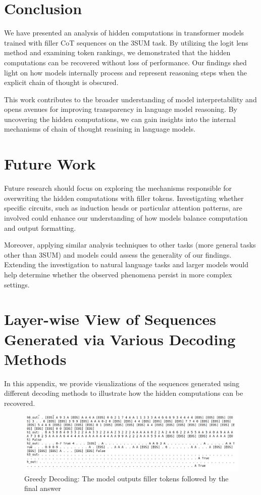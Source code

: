\documentclass{article}
\begin{document}
\newpage
\section{Conclusion}

We have presented an analysis of hidden computations in transformer models trained with filler CoT sequences on the 3SUM task. By utilizing the logit lens method and examining token rankings, we demonstrated that the hidden computations can be recovered without loss of performance. Our findings shed light on how models internally process and represent reasoning steps when the explicit chain of thought is obscured.

This work contributes to the broader understanding of model interpretability and opens avenues for improving transparency in language model reasoning. By uncovering the hidden computations, we can gain insights into the internal mechanisms of chain of thought reasining in language models.

\section{Future Work}

Future research should focus on exploring the mechanisms responsible for overwriting the hidden computations with filler tokens. Investigating whether specific circuits, such as induction heads or particular attention patterns, are involved could enhance our understanding of how models balance computation and output formatting.

Moreover, applying similar analysis techniques to other tasks (more general tasks other than 3SUM) and models could assess the generality of our findings. Extending the investigation to natural language tasks and larger models would help determine whether the observed phenomena persist in more complex settings.

\newpage
\appendix

\section{Layer-wise View of Sequences Generated via Various Decoding Methods}

In this appendix, we provide visualizations of the sequences generated using different decoding methods to illustrate how the hidden computations can be recovered.

\begin{figure}[H]
    \centering
    \includegraphics[width=\textwidth]{greedy_decoding.png}
    \caption{Greedy Decoding: The model outputs filler tokens followed by the final answer}
    \label{fig:greedy}
\end{figure}
\end{document}
